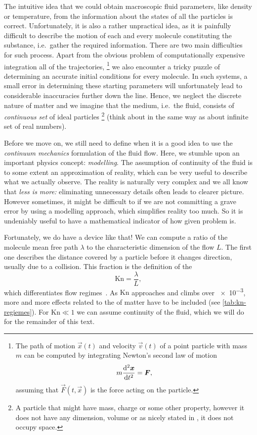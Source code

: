 \documentclass[justified, nobib]{tufte-handout}
\begin{document}
The intuitive idea that we could obtain macroscopic fluid parameters, like
density or temperature, from the information about the states of all the
particles is correct. Unfortunately, it is also a rather unpractical idea, as it
is painfully difficult to describe the motion of each and every molecule
constituting the substance, i.e.\ gather the required information. There are
two main difficulties for such process. Apart from the obvious problem of
computationally expensive integration all of the trajectories,%
\footnote{%
  The path of motion \(\vec{x}(t)\) and velocity \(\vec{v}(t)\) of a point
  particle with mass \(m\) can be computed by integrating Newton's second law
  of motion
  \[
    m\dv[2]{\bm{x}}{t} = \bm{F},
  \]
  assuming that \(\vec{F}(t, \vec{x})\) is the force acting on the particle.
}
we also encounter a tricky puzzle of determining an accurate initial conditions
for every molecule. In such systems, a small error in determining these
starting parameters will unfortunately lead to considerable inaccuracies
further down the line. Hence, we neglect the discrete nature of matter and we
imagine that the medium, i.e.\ the fluid, consists of \emph{continuous set} of ideal
particles%
\footnote{%
	A particle that might have mass, charge or some other property, however it does
	not have any dimension, volume or as nicely stated in
	, it does not occupy space.
} 
(think about in the same way as about infinite set of real numbers).

Before we move on, we still need to define when it is a good idea to use the
\emph{continuum mechanics} formulation of the fluid flow. Here, we stumble upon
an important physics concept: \emph{modelling}. The assumption of continuity of
the fluid is to some extent an approximation of reality, which can be very
useful to describe what we actually observe. The reality is naturally very
complex and we all know that \emph{less is more:} eliminating unnecessary
details often leads to clearer picture. However sometimes, it might be
difficult to  if we are not committing a grave error by using
a modelling approach, which simplifies reality too much. So it is undeniably
useful to have a mathematical indicator of how  given problem
is. 

Fortunately, we do have a device like that! We can compute a ratio of the 
molecule mean free path \(\lambda\) to the characteristic dimension of the 
flow \(L\). The first one describes the distance covered by a particle before 
it changes direction, usually due to a collision. This fraction is the definition
of the 
\[
  \mathrm{Kn} = \dfrac{\lambda}{L},
\]
which differentiates flow regimes~\citep{collin2014}. As \(\mathrm{Kn}\)
approaches and climbs over \num{e-3}, more and more effects related to the
 of matter have to be included (see
\autoref{tab:kn-regiemes}). For \(\mathrm{Kn} \ll 1\) we can assume continuity
of the fluid, which we will do for the remainder of this text. 
\end{document}

